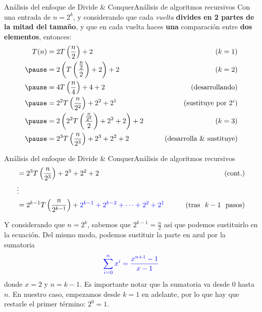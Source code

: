 \documentclass[spanish, c]{beamer}
\begin{document}
\begin{frame}{Análisis del enfoque de Divide \& Conquer}{Análisis de algoritmos recursivos}
    Con una entrada de $n = 2^k$, y considerando que cada \textit{vuelta} \textbf{divides en 2 partes de la mitad del tamaño}, y que en cada vuelta haces \textbf{una} comparación entre \textbf{dos elementos}, entonces: \pause
    \begin{align*}
        T(n) & = 2T\left(\frac{n}{2}\right) + 2  & \tag{$k = 1$}\\ \pause
             & = 2\left(T\left(\frac{\frac{n}{2}}{2}\right) + 2\right) + 2  & \tag{$k = 2$}\\ \pause
             & = 4T\left(\frac{n}{4}\right) + 4 + 2 & \tag{\text{desarrollando}} \\ \pause
             & = 2^2 T\left(\frac{n}{2^2}\right) + 2^2 + 2^1 & \tag{\text{sustituye por }$2^i$} \\ \pause
             & = 2\left(2^2 T\left(\frac{\frac{n}{2^2}}{2}\right) + 2^2  + 2 \right) + 2 & \tag{$k = 3$} \\ \pause
             & = 2^3 T\left(\frac{n}{2^3}\right) + 2^3 + 2^2 + 2 & \tag{\text{desarrolla \& sustituye}} %
    \end{align*}
\end{frame}

\begin{frame}{Análisis del enfoque de Divide \& Conquer}{Análisis de algoritmos recursivos}
    \begin{align*}
        & = 2^3 T\left(\frac{n}{2^3}\right) + 2^3 + 2^2 + 2 & \tag{\text{cont.}} \\ 
        & \vdots \\
        & = 2^{k-1} T\left(\frac{n}{2^{k-1}}\right) + {\color{blue} 2^{k-1} + 2^{k-2} + \dots + 2^2 + 2^1} & \tag{\text{tras } $k-1$ \text{ pasos}}
    \end{align*}

    Y considerando que $n = 2^k$, sabemos que $2^{k-1} = \frac{n}{2}$ así que podemos sustituirlo en la ecuación.    
    Del mismo modo, podemos sustituir la parte en {\color{blue} azul} por la sumatoria
    $$\color{blue} \sum\limits_{i=0}^n x^i = \frac{x^{n+1} - 1}{x - 1}$$
    donde $x = 2$ y $n = k-1$. Es importante notar que la sumatoria va desde $0$ hasta $n$. 
    En nuestro caso, empezamos desde $k=1$ en adelante, por lo que hay que restarle el primer término: $2^0 = 1$.
\end{frame}
\end{document}
